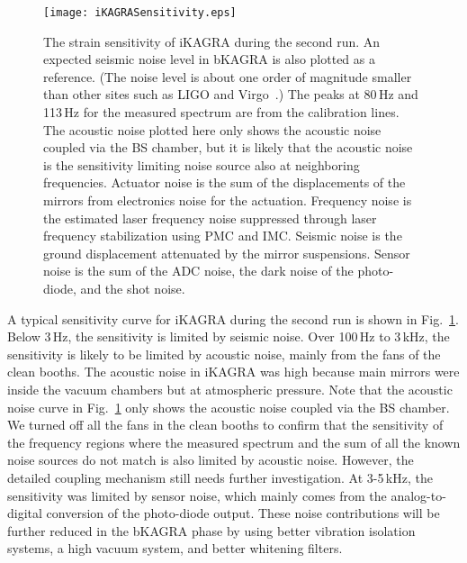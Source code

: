 \documentclass[prd ,twocolumn ,secnumarabic,dvips
,amssymb, amsmath,nobibnotes, aps, prd,superscriptaddress]{revtex4-1}
\begin{document}
{%

\begin{figure}[htbp]
	\begin{center}
		\texttt{[image: iKAGRASensitivity.eps]}
		\caption{\label{fig:iKAGRASensitivity}The strain sensitivity of iKAGRA during the second run. An expected seismic noise level in bKAGRA is also plotted as a reference. (The noise level is about one order of magnitude smaller than other sites such as LIGO and Virgo~\cite{Rana}.) The peaks at 80\,Hz and 113\,Hz for the measured spectrum are from the calibration lines. The acoustic noise plotted here only shows the acoustic noise coupled via the BS chamber, but it is likely that the acoustic noise is the sensitivity limiting noise source also at neighboring frequencies. Actuator noise is the sum of the displacements of the mirrors from electronics noise for the actuation. Frequency noise is the estimated laser frequency noise suppressed through laser frequency stabilization using PMC and IMC. Seismic noise is the ground displacement attenuated by the mirror suspensions. Sensor noise is the sum of the ADC noise, the dark noise of the photo-diode, and the shot noise.}
	\end{center}
\end{figure}

A typical sensitivity curve for iKAGRA during the second run is shown in Fig.~\ref{fig:iKAGRASensitivity}. Below 3\,Hz, the sensitivity is limited by seismic noise. Over 100\,Hz to 3\,kHz, the sensitivity is likely to be limited by acoustic noise, mainly from the fans of the clean booths. The acoustic noise in iKAGRA was high because main mirrors were inside the vacuum chambers but at atmospheric pressure. Note that the acoustic noise curve in Fig.~\ref{fig:iKAGRASensitivity} only shows the acoustic noise coupled via the BS chamber. We turned off all the fans in the clean booths to confirm that the sensitivity of the frequency regions where the measured spectrum and the sum of all the known noise sources do not match is also limited by acoustic noise.
However, the detailed coupling mechanism still needs further investigation. At 3-5\,kHz, the sensitivity was limited by sensor noise, which mainly comes from the analog-to-digital conversion of the photo-diode output. These noise contributions will be further reduced in the bKAGRA phase by using better vibration isolation systems, a high vacuum system, and better whitening filters.

}
\end{document}
